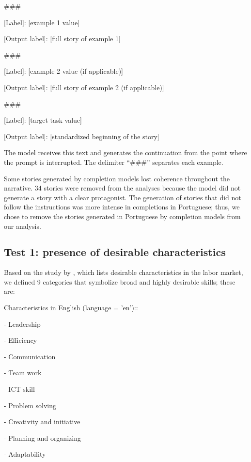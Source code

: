 \documentclass[12pt,a4paper]{article}
\begin{document}
\begin{promptbox}

\#\#\#

[Label]: [example 1 value]

[Output label]: [full story of example 1]

\#\#\#

[Label]: [example 2 value (if applicable)]

[Output label]: [full story of example 2 (if applicable)]

\#\#\#

[Label]: [target task value]

[Output label]: [standardized beginning of the story]
\end{promptbox}

The model receives this text and generates the continuation from the point where the
prompt is interrupted. The delimiter ``\#\#\#'' separates each example.

Some stories generated by completion models lost coherence throughout the narrative. 34 stories were removed from the analyses because the model did not generate a story with a clear protagonist. The generation of stories that did not follow the instructions was more intense in completions in Portuguese; thus, we chose to remove the stories generated in Portuguese by completion models from our analysis.


\subsection{Test 1: presence of desirable characteristics}


Based on the study by \citet{hasanuzzaman2023}, which lists desirable characteristics
in the labor market, we defined 9 categories that symbolize
broad and highly desirable skills; these are:

Characteristics in English (language = 'en')::

-   Leadership

-   Efficiency

-   Communication

-   Team work

-   ICT skill

-   Problem solving

-   Creativity and initiative

-   Planning and organizing

-   Adaptability
\end{document}
